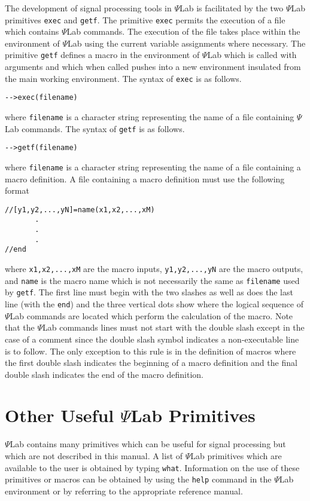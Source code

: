 	The development of signal processing tools in $\Psi$Lab 
is facilitated by
the two $\Psi$Lab primitives {\tt exec} and {\tt getf}.  The primitive
{\tt exec} permits the execution of a file which contains $\Psi$Lab
commands.  The execution of the file takes place within the environment
of $\Psi$Lab using the current variable assignments where necessary.  The
primitive {\tt getf} defines a macro in the environment of $\Psi$Lab
which is called with arguments and which when called pushes into
a new environment insulated from the main working environment.
The syntax of {\tt exec} is as follows.
\begin{verbatim}
-->exec(filename)
\end{verbatim}
where {\tt filename} is a character string representing the 
name of a file containing $\Psi$Lab commands.
The syntax of {\tt getf} is as follows.
\begin{verbatim}
-->getf(filename)
\end{verbatim}
where {\tt filename} is a character string representing the
name of a file containing a macro definition.  A file containing
a macro definition must use the following format 
\begin{verbatim}
//[y1,y2,...,yN]=name(x1,x2,...,xM)
       .
       .
       .
//end
\end{verbatim}
where {\tt x1,x2,...,xM} are the macro inputs, {\tt y1,y2,...,yN} are
the macro outputs, and {\tt name} is the macro name which is not necessarily
the same as {\tt filename} used by {\tt getf}.
The first line must begin with the two slashes as well as does the
last line (with the {\tt end}) and the three
vertical dots show where the logical sequence of $\Psi$Lab commands are
located which perform the calculation of the macro.  Note that the
$\Psi$Lab commands lines must not start with the double slash 
except in the case of a comment since
the double slash symbol indicates a non-executable line is to  follow.
The only exception to this rule is in the definition of macros where
the first double slash indicates the beginning of a macro definition
and the final double slash indicates the end of the macro definition.

\section{Other Useful $\Psi$Lab Primitives}

	$\Psi$Lab contains many primitives which can be useful for
signal processing but which are not described in this manual. A list of $\Psi$Lab primitives which are available to the user is obtained by typing {\tt what}.
  Information on the use of these primitives or macros can
be obtained by using the {\tt help} command in the $\Psi$Lab environment
or by referring to the appropriate reference manual.

